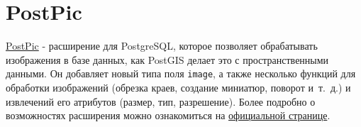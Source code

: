\section{PostPic}

\href{http://drotiro.github.io/postpic/}{PostPic} - расширение для PostgreSQL, которое позволяет обрабатывать изображения в базе данных, как PostGIS делает это с пространственными данными. Он добавляет новый типа поля \lstinline!image!, а также несколько функций для обработки изображений (обрезка краев, создание миниатюр, поворот и~т.~д.) и извлечений его атрибутов (размер, тип, разрешение). Более подробно о возможностях расширения можно ознакомиться на \href{https://github.com/drotiro/postpic/wiki/SQL-Functions-Guide}{официальной странице}.
